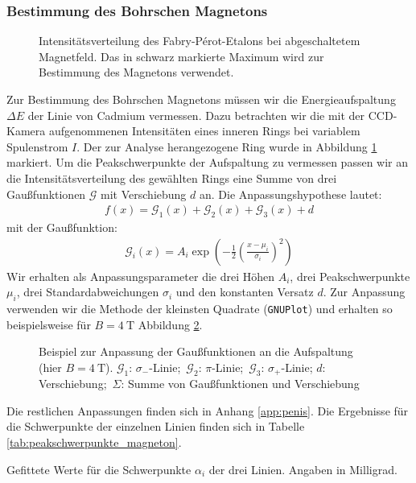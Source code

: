 \documentclass[11pt, a4paper]{article}
\begin{document}
\subsubsection{Bestimmung des Bohrschen Magnetons}
\begin{figure}[h]
	\centering
	
	\caption{Intensitätsverteilung des Fabry-Pérot-Etalons bei abgeschaltetem Magnetfeld. Das in schwarz markierte Maximum wird zur Bestimmung des Magnetons verwendet.}
	\label{fig:peakauswahl}
\end{figure}
Zur Bestimmung des Bohrschen Magnetons müssen wir die Energieaufspaltung $\Delta E$ der Linie von Cadmium vermessen.
Dazu betrachten wir die mit der CCD-Kamera aufgenommenen Intensitäten eines inneren Rings bei variablem Spulenstrom $I$.
Der zur Analyse herangezogene Ring wurde in Abbildung \ref{fig:peakauswahl} markiert.
Um die Peakschwerpunkte der Aufspaltung zu vermessen passen wir an die Intensitätsverteilung des gewählten Rings eine Summe von drei Gaußfunktionen $\mathcal{G}$ mit Verschiebung $d$ an.
Die Anpassungshypothese lautet:
\begin{align}
f(x) = \mathcal{G}_1(x) + \mathcal{G}_2(x) + \mathcal{G}_3(x) + d
\end{align}
mit der Gaußfunktion:
\begin{align}
\mathcal{G}_i(x) = A_i \exp\left( -\frac{1}{2} \left( \frac{x - \mu_i}{\sigma_i} \right)^2 \right)
\end{align}
Wir erhalten als Anpassungsparameter die drei Höhen $A_i$, drei Peakschwerpunkte $\mu_i$, drei Standardabweichungen $\sigma_i$ und den konstanten Versatz $d$.
Zur Anpassung verwenden wir die Methode der kleinsten Quadrate (\texttt{GNUPlot}) und erhalten so beispielsweise für $B = \SI{4}{\tesla}$ Abbildung \ref{fig:zeeman_b4_bsp}.
\begin{figure}[h]
	\centering
	
	\caption{Beispiel zur Anpassung der Gaußfunktionen an die Aufspaltung (hier $B = \SI{4}{\tesla}$). $\mathcal{G}_1$: $\sigma_-$-Linie;\, $\mathcal{G}_2$: $\pi$-Linie;\, $\mathcal{G}_3$: $\sigma_+$-Linie; $d$: Verschiebung;\, $\Sigma$: Summe von Gaußfunktionen und Verschiebung}
	\label{fig:zeeman_b4_bsp}
\end{figure}
Die restlichen Anpassungen finden sich in Anhang \ref{app:penis}.
Die Ergebnisse für die Schwerpunkte der einzelnen Linien finden sich in Tabelle \ref{tab:peakschwerpunkte_magneton}.

\begin{table}[h]
	\centering
	\resizebox{\columnwidth}{!}{%
		}
	\caption{Gefittete Werte für die Schwerpunkte $\alpha_i$ der drei Linien. Angaben in Milligrad.}
	\label{tab:peakschwerpunkte_magneton}
\end{table}
\end{document}
